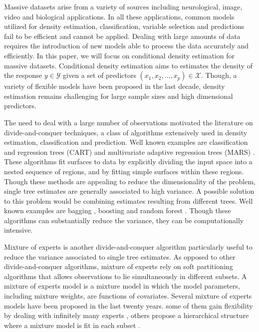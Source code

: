 \documentclass{article}
\begin{document}
Massive datasets arise from a variety of sources including neurological, image, video and biological applications. In all these applications, common models utilized for density estimation, classification, variable selection and predictions fail to be efficient and cannot be applied. Dealing with large amounts of data requires the introduction of new models able to process the data accurately and efficiently. In this paper, we will focus on conditional density estimation for massive datasets. Conditional density estimation aims to estimates the density of the response $y \in \mathcal{Y}$ given a set of predictors $(x_1, x_2, \ldots, x_p)\in \mathcal{X}$. Though, a variety of flexible models have been proposed in the last decade, density estimation remains challenging for large sample sizes and high dimensional predictors. 

The need to deal with a large number of observations motivated the literature on divide-and-conquer techniques, a class of algorithms  extensively used in density estimation, classification and prediction. Well known examples are classification and regression trees (CART) \cite{CART} and multivariate adaptive regression trees (MARS) \cite{MARS}. These algorithms fit surfaces to data by explicitly dividing the input space into a nested sequence of regions, and by fitting simple surfaces  within these regions. Though these methods are appealing to reduce the dimensionality of the problem, single tree estimates are generally associated to high variance. A possible solution to this problem would be combining estimates resulting from different trees. Well known examples are bagging \cite{Bagging}, boosting \cite{Boosting} and random forest \cite{RandomForest}. Though these algorithms can substantially reduce the variance, they can be computationally intensive. 

Mixture of experts \cite{mixtureexperts} is another divide-and-conquer algorithm particularly useful to reduce the variance associated to single tree estimates. As opposed to other divide-and-conquer algorithms, mixture of experts rely on soft partitioning algorithms that allows  observations to lie simultaneously in different subsets. A mixture of experts model is a mixture model in which the model parameters, including mixture weights, are functions of covariates. Several mixture of experts models have been proposed in the last twenty years. some of them gain flexibility by dealing with infinitely many experts \cite{infiniteMoE}  \cite{AltInfMoE}, others propose a hierarchical structure where a mixture model is fit in each subset  \cite{HierMoF} \cite{BHierMoF}.  
\end{document}
